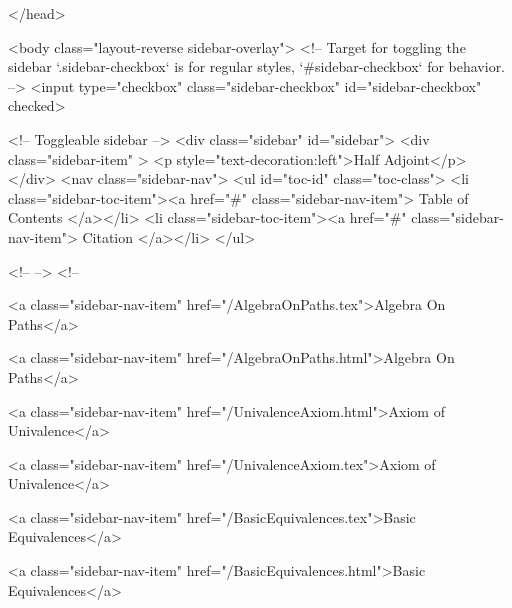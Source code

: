   
</head>




  <body class="layout-reverse sidebar-overlay">
    <!-- Target for toggling the sidebar `.sidebar-checkbox` is for regular
     styles, `#sidebar-checkbox` for behavior. -->
<input type="checkbox" class="sidebar-checkbox" id="sidebar-checkbox" checked>

<!-- Toggleable sidebar -->
<div class="sidebar" id="sidebar">
  <div class="sidebar-item" >
    <p style="text-decoration:left">Half Adjoint</p>
  </div>
  <nav class="sidebar-nav">
    <ul id="toc-id" class="toc-class">
  <li class="sidebar-toc-item"><a href="#" class="sidebar-nav-item"> Table of Contents </a></li>
  <li class="sidebar-toc-item"><a href="#" class="sidebar-nav-item"> Citation </a></li>
</ul>


    <!--  -->
    <!-- 
      
    
      
    
      
    
      
    
      
        
      
    
      
        
          <a class="sidebar-nav-item" href="/AlgebraOnPaths.tex">Algebra On Paths</a>
        
      
    
      
        
          <a class="sidebar-nav-item" href="/AlgebraOnPaths.html">Algebra On Paths</a>
        
      
    
      
        
          <a class="sidebar-nav-item" href="/UnivalenceAxiom.html">Axiom of Univalence</a>
        
      
    
      
        
          <a class="sidebar-nav-item" href="/UnivalenceAxiom.tex">Axiom of Univalence</a>
        
      
    
      
        
          <a class="sidebar-nav-item" href="/BasicEquivalences.tex">Basic Equivalences</a>
        
      
    
      
        
          <a class="sidebar-nav-item" href="/BasicEquivalences.html">Basic Equivalences</a>
        

